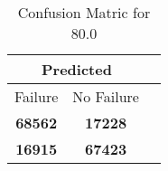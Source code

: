 \begin{table}[] 
\label{Table: Prediction Accuracy-DMD80.0OnlySunEKF-ignoreReflection-Reflection} 
\caption{Confusion Matric for 80.0} 
\centering 
\begin{tabular} 
 {@{}ccc@{}} 
\toprule 
\multicolumn{2}{c}{\textbf{Predicted}}
 \\ \midrule 
\multicolumn{1}{|c|}{Failure} & 
\multicolumn{1}{c|}{No Failure}
 \\ \midrule 
\multicolumn{1}{|c|}{\color{green}\textbf{68562}} & 
\multicolumn{1}{c|}{\color{red}\textbf{17228}}
 \\ \midrule 
\multicolumn{1}{|c|}{\color{red}\textbf{16915}} & 
\multicolumn{1}{c|}{\color{green}\textbf{67423}}
 \\ \bottomrule 
\end{tabular} 
\end{table} 
